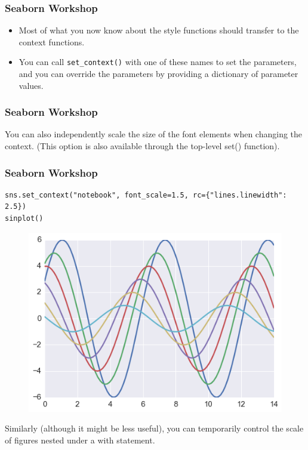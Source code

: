 \documentclass{beamer}
\begin{document}
\begin{frame}[fragile]
	\frametitle{Seaborn Workshop}
	\large 
\begin{itemize}
\item Most of what you now know about the style functions should transfer to the context functions.
\item You can call \texttt{set\_context()} with one of these names to set the parameters, and you can override the parameters by providing a dictionary of parameter values.
\end{itemize}
\end{frame}
\begin{frame}[fragile]
	\frametitle{Seaborn Workshop}
	\large
You can also independently scale the size of the font elements when changing the context. (This option is also available through the top-level set() function).
\end{frame}
\begin{frame}[fragile]
	\frametitle{Seaborn Workshop}
	\large
\begin{verbatim}
sns.set_context("notebook", font_scale=1.5, rc={"lines.linewidth": 2.5})
sinplot()
\end{verbatim}

\begin{figure}
	\centering
	\includegraphics[width=0.7\linewidth]{images/aesthetics_39_0}
\end{figure}

Similarly (although it might be less useful), you can temporarily control the scale of figures nested under a with statement.
\end{frame}
\end{document}
